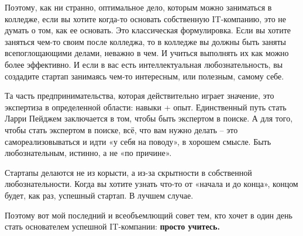 \documentclass[ebook,12pt,oneside,openany]{memoir}
\begin{document}
Поэтому, как ни странно, оптимальное дело, которым можно заниматься в
колледже, если вы хотите когда-то основать собственную IT-компанию,
это не думать о том, как ее основать. Это классическая формулировка.
Если вы хотите заняться чем-то своим после колледжа, то в колледже вы
должны быть заняты всепоглощающими делами, неважно в чем. И учиться
выполнять их как можно более эффективно. И если в вас есть
интеллектуальная любознательность, вы создадите стартап занимаясь
чем-то интересным, или полезным, самому себе. \newline

Та часть предпринимательства, которая действительно играет значение,
это экспертиза в определенной области: навыки + опыт. Единственный
путь стать Ларри Пейджем заключается в том, чтобы быть экспертом в
поиске. А для того, чтобы стать экспертом в поиске, всё, что вам нужно
делать – это самореализовываться и идти «у себя на поводу», в хорошем
смысле. Быть любознательным, истинно, а не «по причине». \newline

Стартапы делаются не из корысти, а из-за скрытности в собственной
любознательности. Когда вы хотите узнать что-то от «начала и до
конца», концом будет, как раз, успешный стартап. В лучшем случае. \newline

Поэтому вот мой последний и всеобъемлющий совет тем, кто хочет в один
день стать основателем успешной IT-компании: \textbf{просто учитесь.}
\end{document}
